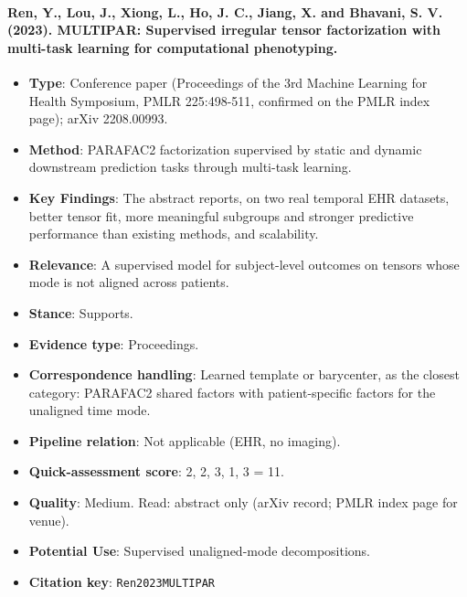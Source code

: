 \documentclass[journal,onecolumn]{IEEEtran}
\begin{document}
\paragraph{Ren, Y., Lou, J., Xiong, L., Ho, J. C., Jiang, X. and Bhavani, S. V. (2023). MULTIPAR: Supervised irregular tensor factorization with multi-task learning for computational phenotyping.~\cite{Ren2023MULTIPAR}}\mbox{}

\begin{itemize}

\item{} \textbf{Type}: Conference paper (Proceedings of the 3rd Machine Learning for Health Symposium, PMLR 225:498-511, confirmed on the PMLR index page); arXiv 2208.00993.

\item{} \textbf{Method}: PARAFAC2 factorization supervised by static and dynamic downstream prediction tasks through multi-task learning.

\item{} \textbf{Key Findings}: The abstract reports, on two real temporal EHR datasets, better tensor fit, more meaningful subgroups and stronger predictive performance than existing methods, and scalability.

\item{} \textbf{Relevance}: A supervised model for subject-level outcomes on tensors whose mode is not aligned across patients.

\item{} \textbf{Stance}: Supports.

\item{} \textbf{Evidence type}: Proceedings.

\item{} \textbf{Correspondence handling}: Learned template or barycenter, as the closest category: PARAFAC2 shared factors with patient-specific factors for the unaligned time mode.

\item{} \textbf{Pipeline relation}: Not applicable (EHR, no imaging).

\item{} \textbf{Quick-assessment score}: 2, 2, 3, 1, 3 = 11.

\item{} \textbf{Quality}: Medium. Read: abstract only (arXiv record; PMLR index page for venue).

\item{} \textbf{Potential Use}: Supervised unaligned-mode decompositions.

\item{} \textbf{Citation key}: \texttt{Ren2023MULTIPAR}

\end{itemize}
\end{document}
